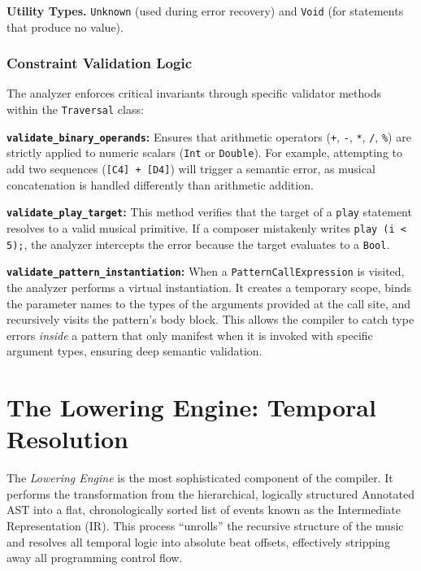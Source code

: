 \noindent \textbf{Utility Types.} \texttt{Unknown} (used during error recovery) and \texttt{Void} (for statements that
produce no value).

\subsubsection{Constraint Validation Logic}
The analyzer enforces critical invariants through specific validator methods within the \texttt{Traversal} class:

\noindent \textbf{\texttt{validate\_binary\_operands}:} Ensures that arithmetic operators (\texttt{+}, \texttt{-},
\texttt{*}, \texttt{/}, \texttt{\%}) are strictly applied to numeric scalars (\texttt{Int} or \texttt{Double}).
For example, attempting to add two sequences (\texttt{[C4] + [D4]}) will trigger a semantic error, as musical
concatenation is handled differently than arithmetic addition.

\noindent \textbf{\texttt{validate\_play\_target}:} This method verifies that the target of a \texttt{play}
statement resolves to a valid musical primitive.
If a composer mistakenly writes \texttt{play (i < 5);}, the analyzer intercepts the error because the target
evaluates to a \texttt{Bool}.

\noindent \textbf{\texttt{validate\_pattern\_instantiation}:} When a \texttt{PatternCallExpression} is visited,
the analyzer
performs a virtual instantiation.
It creates a temporary scope, binds the parameter names to the types of the arguments provided at the call site, and
recursively visits the pattern's body block.
This allows the compiler to catch type errors \textit{inside} a pattern that only manifest when it is invoked with
specific argument types, ensuring deep semantic validation.


\section{The Lowering Engine: Temporal Resolution}\label{detail-sec:implementation-lowering}

The \textit{Lowering Engine} is the most sophisticated component of the compiler.
It performs the transformation from the hierarchical, logically structured Annotated AST into a flat, chronologically
sorted list of events known as the Intermediate Representation (IR).
This process ``unrolls'' the recursive structure of the music and resolves all temporal logic into absolute beat
offsets, effectively stripping away all programming control flow.

